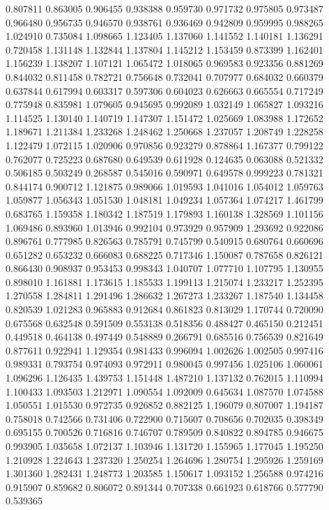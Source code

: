 0.807811
0.863005
0.906455
0.938388
0.959730
0.971732
0.975805
0.973487
0.966480
0.956735
0.946570
0.938761
0.936469
0.942809
0.959995
0.988265
1.024910
0.735084
1.098665
1.123405
1.137060
1.141552
1.140181
1.136291
0.720458
1.131148
1.132844
1.137804
1.145212
1.153459
0.873399
1.162401
1.156239
1.138207
1.107121
1.065472
1.018065
0.969583
0.923356
0.881269
0.844032
0.811458
0.782721
0.756648
0.732041
0.707977
0.684032
0.660379
0.637844
0.617994
0.603317
0.597306
0.604023
0.626663
0.665554
0.717249
0.775948
0.835981
1.079605
0.945695
0.992089
1.032149
1.065827
1.093216
1.114525
1.130140
1.140719
1.147307
1.151472
1.025669
1.083988
1.172652
1.189671
1.211384
1.233268
1.248462
1.250668
1.237057
1.208749
1.228258
1.122479
1.072115
1.020906
0.970856
0.923279
0.878864
1.167377
0.799122
0.762077
0.725223
0.687680
0.649539
0.611928
0.124635
0.063088
0.521332
0.506185
0.503249
0.268587
0.545016
0.590971
0.649578
0.999223
0.781321
0.844174
0.900712
1.121875
0.989066
1.019593
1.041016
1.054012
1.059763
1.059877
1.056343
1.051530
1.048181
1.049234
1.057364
1.074217
1.461799
0.683765
1.159358
1.180342
1.187519
1.179893
1.160138
1.328569
1.101156
1.069486
0.893960
1.013946
0.992104
0.973929
0.957909
1.293692
0.922086
0.896761
0.777985
0.826563
0.785791
0.745799
0.540915
0.680764
0.660696
0.651282
0.653232
0.666083
0.688225
0.717346
1.150087
0.787658
0.826121
0.866430
0.908937
0.953453
0.998343
1.040707
1.077710
1.107795
1.130955
0.898010
1.161881
1.173615
1.185533
1.199113
1.215074
1.233217
1.252395
1.270558
1.284811
1.291496
1.286632
1.267273
1.233267
1.187540
1.134458
0.820539
1.021283
0.965883
0.912684
0.861823
0.813029
1.170744
0.720090
0.675568
0.632548
0.591509
0.553138
0.518356
0.488427
0.465150
0.212451
0.449518
0.464138
0.497449
0.548889
0.266791
0.685516
0.756539
0.821649
0.877611
0.922941
1.129354
0.981433
0.996094
1.002626
1.002505
0.997416
0.989331
0.793754
0.974093
0.972911
0.980045
0.997456
1.025106
1.060061
1.096296
1.126435
1.439753
1.151448
1.487210
1.137132
0.762015
1.110994
1.100433
1.093503
1.212971
1.090554
1.092009
0.645634
1.087570
1.074588
1.050551
1.015530
0.972735
0.926852
0.882125
1.196079
0.807007
1.194187
0.758018
0.742566
0.731406
0.722900
0.715607
0.708656
0.702035
0.398349
0.695155
0.700526
0.716816
0.746707
0.789509
0.840822
0.894785
0.946675
0.993905
1.035658
1.072137
1.103946
1.131720
1.155965
1.177045
1.195250
1.210928
1.224643
1.237320
1.250254
1.264696
1.280754
1.295926
1.259169
1.301360
1.282431
1.248773
1.203585
1.150617
1.093152
1.256588
0.974216
0.915907
0.859682
0.806072
0.891344
0.707338
0.661923
0.618766
0.577790
0.539365
